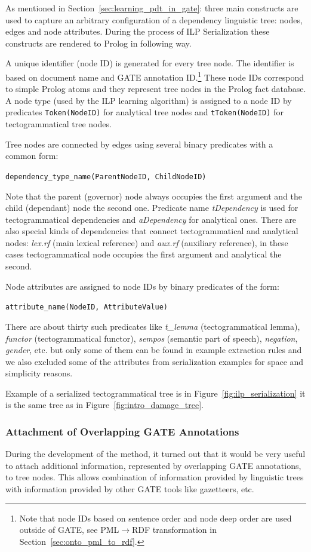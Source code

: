 As mentioned in Section~\ref{sec:learning_pdt_in_gate}: three main constructs are used to capture an arbitrary configuration of a dependency linguistic tree: nodes, edges and node attributes. During the process of ILP Serialization these constructs are rendered to Prolog in following way. 

A unique identifier (node ID) is generated for every tree node. The identifier is based on document name and GATE annotation ID.\footnote{Note that node IDs based on sentence order and node deep order are used outside of GATE, see PML$\rightarrow$RDF transformation in Section~\ref{sec:onto_pml_to_rdf}.} These node IDs correspond to simple Prolog atoms and they represent tree nodes in the Prolog fact database. A node type (used by the ILP learning algorithm) is assigned to a node ID by predicates \texttt{Token(NodeID)} for analytical tree nodes and \texttt{tToken(NodeID)} for tectogrammatical tree nodes.

Tree nodes are connected by edges using several binary predicates with a common form:

\texttt{dependency\_type\_name(ParentNodeID, ChildNodeID)}

\noindent Note that the parent (governor) node always occupies the first argument and the child (dependant) node the second one. Predicate name \emph{tDependency} is used for tectogrammatical dependencies and \emph{aDependency} for analytical ones. There are also special kinds of dependencies that connect tectogrammatical and analytical nodes: \emph{lex.rf} (main lexical reference) and \emph{aux.rf} (auxiliary reference), in these cases tectogrammatical node occupies the first argument and analytical the second.

Node attributes are assigned to node IDs by binary predicates of the form:

\texttt{attribute\_name(NodeID, AttributeValue)}

\noindent There are about thirty such predicates like \emph{t\_lemma} (tectogrammatical lemma), \emph{functor} (tectogrammatical functor), \emph{sempos} (semantic part of speech), \emph{negation}, \emph{gender}, etc. but only some of them can be found in example extraction rules and we also excluded some of the attributes from serialization examples for space and simplicity reasons.

Example of a serialized tectogrammatical tree is in Figure~\ref{fig:ilp_serialization} it is the same tree as in Figure~\ref{fig:intro_damage_tree}.

\subsubsection{Attachment of Overlapping GATE Annotations}
During the development of the method, it turned out that it would be very useful to attach additional information, represented by overlapping GATE annotations, to tree nodes. This allows combination of information provided by linguistic trees with information provided by other GATE tools like gazetteers, etc. 

